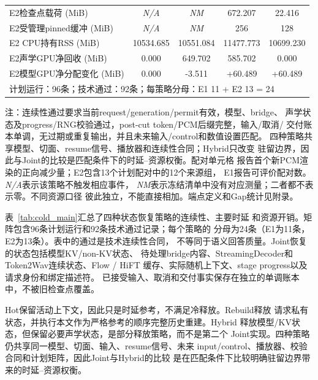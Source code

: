 \documentclass{article}
\begin{document}
\begin{table}[H]
\begin{tabular*}{\columnwidth}{@{\extracolsep{\fill}}lcccc@{}}
E2检查点载荷 (MiB)
& \textit{N/A}
& \textit{NM}
& 672.207
& 22.416 \\

E2受管理pinned缓冲 (MiB)
& \textit{N/A}
& \textit{NM}
& 256
& 128 \\

E2 CPU持有RSS (MiB)
& 10534.685
& 10551.084
& 11477.773
& 10699.230 \\

E2声学GPU净回收 (MiB)
& 0.000
& 649.702
& 585.702
& 0.000 \\

E2模型GPU净分配变化 (MiB)
& 0.000
& -3.511
& +60.489
& +60.489 \\
\midrule
\multicolumn{5}{l}{
\scriptsize 计划运行：96条；技术通过：92条；每策略分母：E1 11 + E2 13 = 24
} \\
\bottomrule
\end{tabular*}

\vspace{1mm}
\begin{flushleft}
\scriptsize
注：连续性通过要求当前request/generation/permit有效，模型、bridge、
声学状态及progress/RNG校验通过，post-cut token/PCM后缀完整，输入/取消/
交付账本单调，无过期或重复输出，并且未来输入/control和数值设置匹配。
四种策略共享模型、切面、resume信号、播放器和连续性合同；Hybrid只改变
驻留边界，因此与Joint的比较是匹配条件下的时延--资源权衡。配对单元格
报告首个新PCM渲染的正向减少量；E2包含13个计划配对中的12个来源组，
E1报告可评价配对数。\textit{N/A}表示该策略不触发相应事件，
\textit{NM}表示冻结清单中没有对应测量；二者都不表示零。不同资源口径
彼此独立，不能直接相加。端点定义和Gap统计见附录。
\end{flushleft}
\end{table}
\FloatBarrier

表~\ref{tab:cold_main}汇总了四种状态恢复策略的连续性、主要时延
和资源开销。矩阵包含96条计划运行和92条技术通过记录；每个策略的
分母为24条（E1为11条，E2为13条）。表中的通过是技术连续性合同，
不等同于语义回答质量。Joint恢复的状态包括模型KV/non-KV状态、
待处理bridge内容、StreamingDecoder和Token2Wav连续状态、Flow / HiFT
缓存、实际随机上下文、stage progress以及请求身份和绑定描述符。
已接受输入、取消和交付事实保存在独立的单调账本中，不被旧检查点覆盖。

Hot保留活动上下文，因此只是时延参考，不满足冷释放。Rebuild释放
请求私有状态，并执行本文作为严格参考的顺序完整历史重建。Hybrid
释放模型/KV状态，但保留必要声学状态，是部分释放策略，而不是第二个
Joint实现。四种策略仍共享同一模型、切面、输入、resume信号、未来
input/control、播放器、校验合同和计划矩阵，因此Joint与Hybrid的比较
是在匹配条件下比较明确驻留边界带来的时延--资源权衡。
\end{document}
